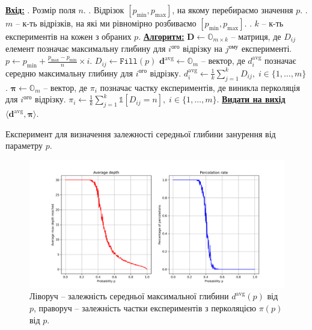 \documentclass[14pt]{extarticle}
\begin{document}
\begin{algorithm}
    \begin{algorithmic}
        \State \textbf{\underline{Вхід:}}
        . Розмір поля $n$.
        . Відрізок $[p_{\min},p_{\max}]$, на якому перебираємо значення $p$.
        . $m$ -- к-ть відрізків, на які ми рівномірно розбиваємо $[p_{\min},p_{\max}]$.
        . $k$ -- к-ть експериментів на кожен з обраних $p$.
        \State \textbf{\underline{Алгоритм:}}
        \State $\boldsymbol{D} \gets \mathds{O}_{m\times k}$ -- матриця, де $D_{ij}$ елемент позначає максимальну глибину для $i^{\text{ого}}$ відрізку на $j^{\text{ому}}$ експерименті.
            \State $p \gets p_{\min} + \frac{p_{\max}-p_{\min}}{n}\times i$.
                \State $D_{ij} \gets \texttt{Fill}(p)$
            \EndFor
        \EndFor
        \State $\mathbf{d}^{\text{avg}} \gets \mathds{O}_{m}$ -- вектор, де $d_i^{\text{avg}}$ позначає середню максимальну глибину для $i^{\text{ого}}$ відрізку.
        \State $d^{\text{avg}}_i \gets \frac{1}{k}\sum_{j=1}^k D_{ij}, \; i \in \{1,\dots,m\}$.
        \State $\boldsymbol{\pi} \gets \mathds{O}_m$ -- вектор, де $\pi_i$ позначає частку експериментів, де виникла перколяція для $i^{\text{ого}}$ відрізку.
        \State $\pi_i \gets \frac{1}{k}\sum_{j=1}^k \mathds{1}\left[D_{ij} = n\right], \; i \in \{1,\dots,m\}$.
        \State \textbf{\underline{Видати на вихід}} $\langle\boldsymbol{d}^{\text{avg}},\boldsymbol{\pi}\rangle$.
        \caption{Експеримент для визначення залежності середньої глибини занурення від параметру $p$.}
        \label{alg:experiment}
    \end{algorithmic}
\end{algorithm}

\begin{figure}
    \centering
    \includegraphics[width=\textwidth]{images/hw_1/depths.png}
    \caption{Ліворуч -- залежність середньої максимальної глибини $d^{\text{avg}}(p)$ від $p$, праворуч -- залежність частки експериментів з перколяцією $\pi(p)$ від $p$.}
    \label{fig:results}
\end{figure}
\end{document}
